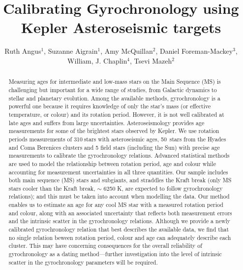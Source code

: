 \documentclass[10pt,preprint]{aastex}
\newcommand{\nastero}{310}
\newcommand{\nHC}{50~}
\begin{document}
\title{Calibrating Gyrochronology using Kepler Asteroseismic targets}

\author{Ruth Angus$^1$, Suzanne Aigrain$^1$, Amy McQuillan$^2$, Daniel Foreman-Mackey$^3$,  William, J. Chaplin$^4$, Tsevi Mazeh$^2$}

\begin{abstract}
\label{abs}

Measuring ages for intermediate and low-mass stars on the Main Sequence (MS) is challenging but important for a wide range of studies, from Galactic dynamics to stellar and planetary evolution.
Among the available methods, gyrochronology is a powerful one because it requires knowledge of only the star's mass (or effective temperature, or colour) and its rotation period.
However, it is not well calibrated at late ages and suffers from large uncertainties.
Asteroseismology provides age measurements for some of the brightest stars observed by Kepler.
We use rotation periods measurements of \nastero$~$stars with asteroseismic ages, \nHC stars from the Hyades and Coma Berenices clusters and 5 field stars (including the Sun) with precise age measurements to calibrate the gyrochronology relations.
Advanced statistical methods are used to model the relationship between rotation period, age and colour while accounting for measurement uncertainties in all three quantities.
Our sample includes both main sequence (MS) stars and subgiants, and straddles the Kraft break (only MS stars cooler than the Kraft break, $\sim$ 6250 K, are expected to follow gyrochronology relations); and this must be taken into account when modelling the data.
Our method enables us to estimate an age for any cool MS star with a measured rotation period and colour, along with an associated uncertainty that reflects both measurement errors and the intrinsic scatter in the gyrochronology relations.
Although we provide a newly calibrated gyrochronology relation that best describes the available data, we find that no single relation beween rotation period, colour and age can adequately describe each cluster.
This may have concerning consequences for the overall reliability of gyrochronology as a dating method---further investigation into the level of intrinsic scatter in the gyrochronology parameters will be required.

\end{abstract}
\end{document}
